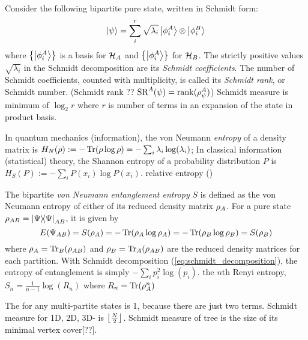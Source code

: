\begin{definition}\label{def:schmidt_measure}
	Consider the following bipartite pure state, written in Schmidt form:
	\begin{equation}
		\ket{\psi} = \sum_i^r \sqrt{\lambda_i} \ket{\phi_i^A}\otimes\ket{\phi_i^B}
		\label{eq:schmidt_decomposition}
	\end{equation}
	where $\qty{\ket{\phi_i^A}}$ is a basis for $\mathcal{H}_A$ and $\qty{\ket{\phi_i^A}}$ for $\mathcal{H}_B$.
	The strictly positive values $\sqrt{\lambda_i}$ in the Schmidt decomposition are its \emph{Schmidt coefficients}. 
	The number of Schmidt coefficients, counted with multiplicity, is called its \emph{Schmidt rank}, or Schmidt number. (Schmidt rank ?? $\text{SR}^A(\psi)=\rank(\rho_{\psi}^A)$)
	Schmidt measure is minimum of $\log_2 r$ where $r$ is number of terms in an expansion of the state in product basis.
\end{definition}
\begin{definition}[entropy]\label{def:entropy}
	In quantum mechanics (information), the von Neumann \emph{entropy} of a density matrix is $H_N(\rho): = -\Tr(\rho \log \rho)=-\sum_i\lambda_i\log(\lambda_i)$;
	In classical information (statistical) theory, the Shannon entropy of a probability distribution $P$ is  $H_S(P):= -\sum_i P(x_i) \log P(x_i)$.
	relative entropy ()
\end{definition}
\begin{definition}\label{def:entanglement_entropy}
	The bipartite \emph{von Neumann entanglement entropy} $S$
	is defined as the von Neumann entropy of either of
	its reduced density matrix $\rho_A$.
	For a pure state $\rho_{AB}=\op{\Psi}{\Psi}_{AB}$,
	it is given by
	\begin{equation}
		E(\Psi_{AB}) 
		= S(\rho_A)
		= -\Tr(\rho_A \log \rho_A)
		= -\Tr(\rho_B \log \rho_B)
		= S(\rho_B)
	\end{equation}
	where $\rho_A= \Tr_B(\rho_{AB})$ and $\rho_B = \Tr_A(\rho_{AB})$ 
	are the reduced density matrices for each partition.
	With Schmidt decomposition (\cref{eq:schmidt_decomposition}), the entropy of entanglement is simply $-\sum_ip_i^2\log(p_i)$.
	the $n$th Renyi entropy,
	$S_n = \frac{1}{n-1} \log (R_n)$
	where $R_n = \Tr(\rho^n_A)$
\end{definition}
\begin{example}
	The  for any multi-partite  states is 1, because there are just two terms.
	Schmidt measure for 1D, 2D, 3D- is $\left\lfloor \frac{N}{2} \right\rfloor$.
	Schmidt measure of tree is the size of its minimal vertex cover[??].
\end{example}

